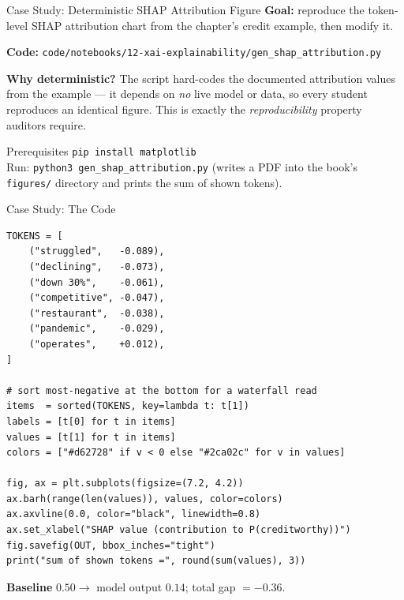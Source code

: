 \documentclass[9pt,t]{beamer}
\begin{document}
\begin{frame}{Case Study: Deterministic SHAP Attribution Figure}
\textbf{Goal:} reproduce the token-level SHAP attribution chart from the chapter's
credit example, then modify it.

\medskip
\textbf{Code:} \texttt{code/notebooks/12-xai-explainability/gen\_shap\_attribution.py}

\medskip
\textbf{Why deterministic?} The script hard-codes the documented attribution
values from the example --- it depends on \emph{no} live model or data, so every
student reproduces an identical figure. This is exactly the
\emph{reproducibility} property auditors require.

\medskip
\begin{alertblock}{Prerequisites}
\texttt{pip install matplotlib}\\
Run: \texttt{python3 gen\_shap\_attribution.py} (writes a PDF into the book's
\texttt{figures/} directory and prints the sum of shown tokens).
\end{alertblock}
\end{frame}

\begin{frame}[fragile]{Case Study: The Code}
\begin{lstlisting}[basicstyle=\ttfamily\scriptsize]
TOKENS = [
    ("struggled",   -0.089),
    ("declining",   -0.073),
    ("down 30%",    -0.061),
    ("competitive", -0.047),
    ("restaurant",  -0.038),
    ("pandemic",    -0.029),
    ("operates",    +0.012),
]

# sort most-negative at the bottom for a waterfall read
items  = sorted(TOKENS, key=lambda t: t[1])
labels = [t[0] for t in items]
values = [t[1] for t in items]
colors = ["#d62728" if v < 0 else "#2ca02c" for v in values]

fig, ax = plt.subplots(figsize=(7.2, 4.2))
ax.barh(range(len(values)), values, color=colors)
ax.axvline(0.0, color="black", linewidth=0.8)
ax.set_xlabel("SHAP value (contribution to P(creditworthy))")
fig.savefig(OUT, bbox_inches="tight")
print("sum of shown tokens =", round(sum(values), 3))
\end{lstlisting}
\textbf{Baseline} $0.50 \to$ model output $0.14$; total gap $= -0.36$.
\end{frame}
\end{document}
